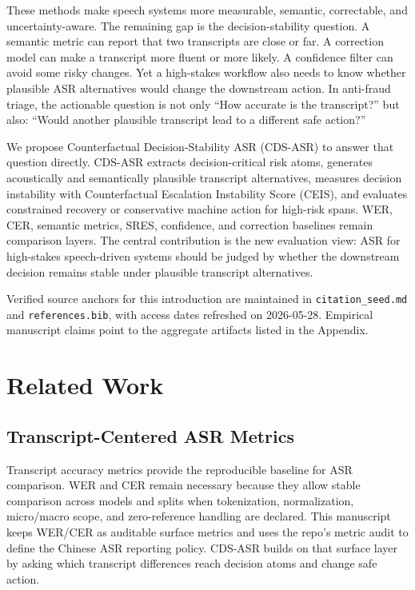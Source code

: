 \documentclass[
]{article}
\begin{document}
These methods make speech systems more measurable, semantic,
correctable, and uncertainty-aware. The remaining gap is the
decision-stability question. A semantic metric can report that two
transcripts are close or far. A correction model can make a transcript
more fluent or more likely. A confidence filter can avoid some risky
changes. Yet a high-stakes workflow also needs to know whether plausible
ASR alternatives would change the downstream action. In anti-fraud
triage, the actionable question is not only ``How accurate is the
transcript?'' but also: ``Would another plausible transcript lead to a
different safe action?''

We propose Counterfactual Decision-Stability ASR (CDS-ASR) to answer
that question directly. CDS-ASR extracts decision-critical risk atoms,
generates acoustically and semantically plausible transcript
alternatives, measures decision instability with Counterfactual
Escalation Instability Score (CEIS), and evaluates constrained recovery
or conservative machine action for high-risk spans. WER, CER, semantic
metrics, SRES, confidence, and correction baselines remain comparison
layers. The central contribution is the new evaluation view: ASR for
high-stakes speech-driven systems should be judged by whether the
downstream decision remains stable under plausible transcript
alternatives.

Verified source anchors for this introduction are maintained in
\texttt{citation\_seed.md} and \texttt{references.bib}, with access
dates refreshed on 2026-05-28. Empirical manuscript claims point to the
aggregate artifacts listed in the Appendix.

\hypertarget{related-work}{%
\section{Related Work}\label{related-work}}

\hypertarget{transcript-centered-asr-metrics}{%
\subsection{Transcript-Centered ASR
Metrics}\label{transcript-centered-asr-metrics}}

Transcript accuracy metrics provide the reproducible baseline for ASR
comparison. WER and CER remain necessary because they allow stable
comparison across models and splits when tokenization, normalization,
micro/macro scope, and zero-reference handling are declared. This
manuscript keeps WER/CER as auditable surface metrics and uses the
repo's metric audit to define the Chinese ASR reporting policy. CDS-ASR
builds on that surface layer by asking which transcript differences
reach decision atoms and change safe action.
\end{document}
